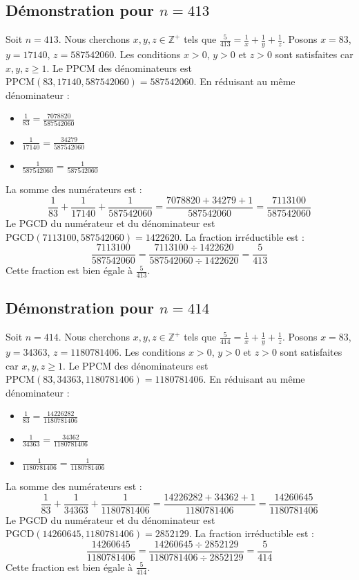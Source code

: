 \documentclass[11pt,a4paper]{article}
\begin{document}
\subsection{Démonstration pour $n = 413$}
Soit $n = 413$. Nous cherchons $x, y, z \in \mathbb{Z}^{+}$ tels que $\frac{5}{413} = \frac{1}{x} + \frac{1}{y} + \frac{1}{z}$.
Posons $x = 83$, $y = 17140$, $z = 587542060$.
Les conditions $x > 0$, $y > 0$ et $z > 0$ sont satisfaites car $x, y, z \geq 1$.
Le PPCM des dénominateurs est $\text{PPCM}(83, 17140, 587542060) = 587542060$.
En réduisant au même dénominateur :
\begin{itemize}
    \item $\frac{1}{83} = \frac{7078820}{587542060}$
    \item $\frac{1}{17140} = \frac{34279}{587542060}$
    \item $\frac{1}{587542060} = \frac{1}{587542060}$
\end{itemize}
La somme des numérateurs est :
$$ \frac{1}{83} + \frac{1}{17140} + \frac{1}{587542060} = \frac{7078820 + 34279 + 1}{587542060} = \frac{7113100}{587542060} $$
Le PGCD du numérateur et du dénominateur est $\text{PGCD}(7113100, 587542060) = 1422620$.
La fraction irréductible est :
$$ \frac{7113100}{587542060} = \frac{7113100 \div 1422620}{587542060 \div 1422620} = \frac{5}{413} $$
Cette fraction est bien égale à $\frac{5}{413}$.

\subsection{Démonstration pour $n = 414$}
Soit $n = 414$. Nous cherchons $x, y, z \in \mathbb{Z}^{+}$ tels que $\frac{5}{414} = \frac{1}{x} + \frac{1}{y} + \frac{1}{z}$.
Posons $x = 83$, $y = 34363$, $z = 1180781406$.
Les conditions $x > 0$, $y > 0$ et $z > 0$ sont satisfaites car $x, y, z \geq 1$.
Le PPCM des dénominateurs est $\text{PPCM}(83, 34363, 1180781406) = 1180781406$.
En réduisant au même dénominateur :
\begin{itemize}
    \item $\frac{1}{83} = \frac{14226282}{1180781406}$
    \item $\frac{1}{34363} = \frac{34362}{1180781406}$
    \item $\frac{1}{1180781406} = \frac{1}{1180781406}$
\end{itemize}
La somme des numérateurs est :
$$ \frac{1}{83} + \frac{1}{34363} + \frac{1}{1180781406} = \frac{14226282 + 34362 + 1}{1180781406} = \frac{14260645}{1180781406} $$
Le PGCD du numérateur et du dénominateur est $\text{PGCD}(14260645, 1180781406) = 2852129$.
La fraction irréductible est :
$$ \frac{14260645}{1180781406} = \frac{14260645 \div 2852129}{1180781406 \div 2852129} = \frac{5}{414} $$
Cette fraction est bien égale à $\frac{5}{414}$.
\end{document}
